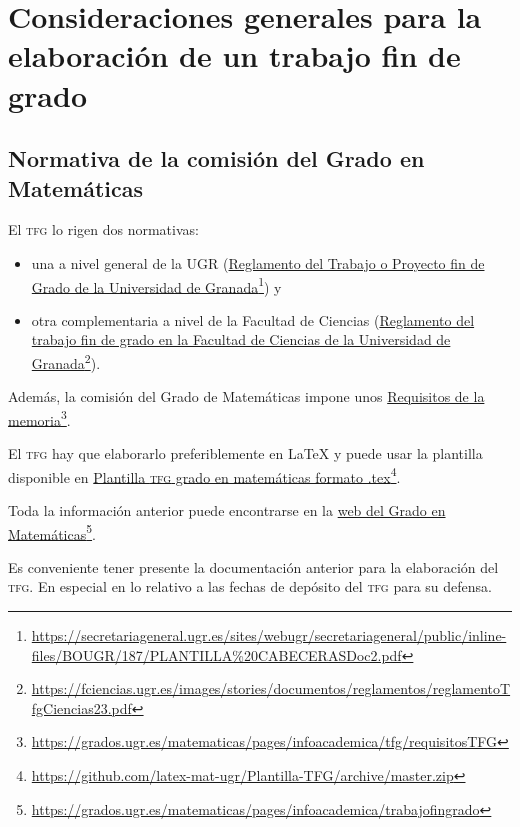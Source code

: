 \chapter[Consideraciones elaboración TFG]{Consideraciones generales para la elaboración de un trabajo fin de grado}

\section{Normativa de la comisión del Grado en Matemáticas}

El \textsc{tfg} lo rigen dos normativas: 
\begin{itemize}
  \item una a nivel general de la UGR (\href{https://secretariageneral.ugr.es/sites/webugr/secretariageneral/public/inline-files/BOUGR/187/PLANTILLA%20CABECERASDoc2.pdf}{Reglamento del Trabajo o Proyecto fin de Grado de la Universidad de Granada}\footnote{\url{https://secretariageneral.ugr.es/sites/webugr/secretariageneral/public/inline-files/BOUGR/187/PLANTILLA\%20CABECERASDoc2.pdf}}) y 
  \item otra complementaria a nivel de la Facultad de Ciencias  (\href{https://fciencias.ugr.es/images/stories/documentos/reglamentos/reglamentoTfgCiencias23.pdf}{Reglamento del trabajo fin de grado en la Facultad de Ciencias de la Universidad de Granada}\footnote{\url{https://fciencias.ugr.es/images/stories/documentos/reglamentos/reglamentoTfgCiencias23.pdf}}). 
\end{itemize} 
Además, la comisión del Grado de Matemáticas impone unos \href{https://grados.ugr.es/matematicas/pages/infoacademica/tfg/requisitosTFG}{Requisitos de la memoria}\footnote{\url{https://grados.ugr.es/matematicas/pages/infoacademica/tfg/requisitosTFG}}.

El \textsc{tfg} hay que elaborarlo preferiblemente en LaTeX y puede usar la plantilla disponible en \href{https://github.com/latex-mat-ugr/Plantilla-TFG/archive/master.zip}{Plantilla \textsc{tfg} grado en matemáticas formato .tex}\footnote{\url{https://github.com/latex-mat-ugr/Plantilla-TFG/archive/master.zip}}.

Toda la información anterior puede encontrarse en la \href{https://grados.ugr.es/matematicas/pages/infoacademica/trabajofingrado}{web del Grado en Matemáticas}\footnote{\url{https://grados.ugr.es/matematicas/pages/infoacademica/trabajofingrado}}.

Es conveniente tener presente la documentación anterior para la elaboración del \textsc{tfg}. En especial en lo relativo a las fechas de depósito del \textsc{tfg} para su defensa.

